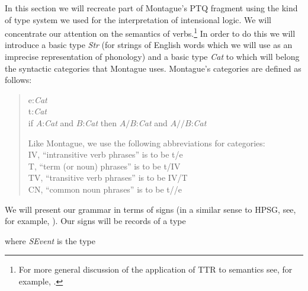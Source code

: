 In this section we will recreate part of Montague's PTQ fragment using the
kind of type system we used for the interpretation of intensional
logic.  We will concentrate our attention on the semantics of
verbs.\footnote{For more general discussion of the application of TTR to
  semantics see, for example, \cite{Cooper2005a,Fernandez2006,Ginzburgforthcoming}.}  In order to
do this we will introduce a basic type \textit{Str} (for strings of
English words which we will use as an imprecise representation of
phonology) and a basic type \textit{Cat} to which will belong the
syntactic categories that Montague uses.  Montague's categories
are defined as follows:
\begin{quote}
e:\textit{Cat} \\
t:\textit{Cat} \\
if $A$:\textit{Cat} and $B$:\textit{Cat} then $A/B$:\textit{Cat} and
$A//B$:\textit{Cat}

Like Montague, we use the following abbreviations for categories:\\
IV, ``intransitive verb phrases'' is to be t/e \\
T, ``term (or noun) phrases'' is to be t/IV \\
TV, ``transitive verb phrases'' is to be IV/T \\
CN, ``common noun phrases'' is to be t//e
\end{quote}
We will present our grammar in terms of signs (in a similar sense to
HPSG, see, for example, \cite{Sag:Wasow:ea:03}).  Our signs will be
records of a type
\begin{display}
\end{display}
where \textit{SEvent} is the type 
\begin{quote}
\end{quote}
